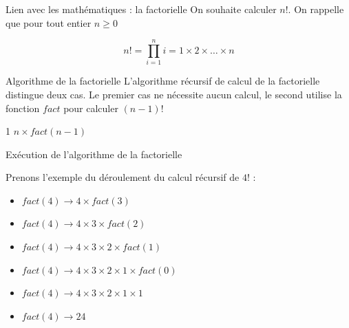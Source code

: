 \documentclass[10pt,xcolor=dvipsnames]{beamer}
\begin{document}
\begin{frame}{Lien avec les mathématiques : la factorielle}
On souhaite calculer $n!$. On rappelle que pour tout entier $n \geq 0$

\begin{equation*}
    n! = \prod_{i=1}^{n} i = 1 \times 2 \times \ldots \times n
\end{equation*}


\end{frame}



\begin{frame}{Algorithme de la factorielle}
L'algorithme récursif de calcul de la factorielle distingue deux cas. Le premier cas ne nécessite aucun calcul, le second utilise la fonction $fact$ pour calculer $(n-1)!$

\begin{tcolorbox}
  \begin{algorithmic}[1]
        \State{} 1
      \Else
        \State{} $n \times fact(n-1)$
      \EndIf
    \EndFunction
  \end{algorithmic}
\end{tcolorbox}

\end{frame}

\begin{frame}{Exécution de l'algorithme de la factorielle}

Prenons l'exemple du déroulement du calcul récursif de $4!$ :
\begin{center}
    \begin{itemize}[<+->]
\item[] $fact(4) \rightarrow 4 \times fact(3)$
\item[] $fact(4) \rightarrow 4 \times 3 \times fact(2)$
\item[] $fact(4) \rightarrow 4 \times 3 \times 2 \times fact(1)$
\item[] $fact(4) \rightarrow 4 \times 3 \times 2 \times 1 \times fact(0)$
\item[] $fact(4) \rightarrow 4 \times 3 \times 2 \times 1 \times 1$
\item[] $fact(4) \rightarrow 24$
\end{itemize}
\end{center}
\end{frame}
\end{document}
